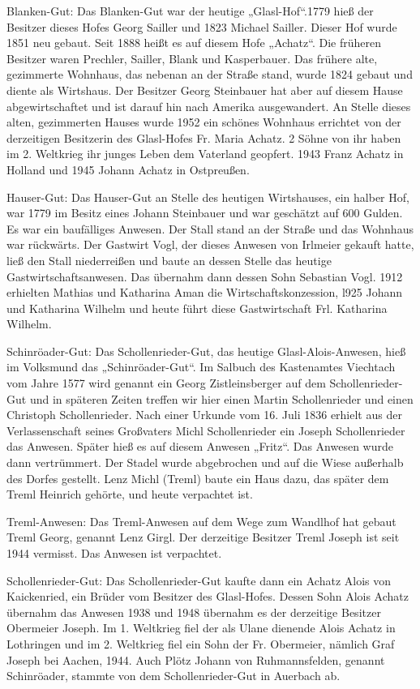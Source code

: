 \documentclass{book}
\begin{document}
Blanken-Gut: Das Blanken-Gut war der heutige „Glasl-Hof“.1779 hieß der Besitzer
dieses Hofes Georg Sailler und 1823 Michael Sailler. Dieser Hof wurde 1851 neu
gebaut. Seit 1888 heißt es auf diesem Hofe „Achatz“. Die früheren Besitzer waren
Prechler, Sailler, Blank und Kasperbauer. Das frühere alte, gezimmerte Wohnhaus,
das nebenan an der Straße stand, wurde 1824 gebaut und diente als Wirtshaus. Der
Besitzer Georg Steinbauer hat aber auf diesem Hause abgewirtschaftet und ist
darauf hin nach Amerika ausgewandert. An Stelle dieses alten, gezimmerten Hauses
wurde 1952 ein schönes Wohnhaus errichtet von der derzeitigen Besitzerin des
Glasl-Hofes Fr. Maria Achatz. 2 Söhne von ihr haben im 2. Weltkrieg ihr junges
Leben dem Vaterland geopfert. 1943 Franz Achatz in Holland und 1945 Johann
Achatz in Ostpreußen.

Hauser-Gut: Das Hauser-Gut an Stelle des heutigen Wirtshauses, ein halber Hof,
war 1779 im Besitz eines Johann Steinbauer und war geschätzt auf 600 Gulden. Es
war ein baufälliges Anwesen. Der Stall stand an der Straße und das Wohnhaus war
rückwärts. Der Gastwirt Vogl, der dieses Anwesen von Irlmeier gekauft hatte,
ließ den Stall niederreißen und baute an dessen Stelle das heutige
Gastwirtschaftsanwesen. Das übernahm dann dessen Sohn Sebastian Vogl. 1912
erhielten Mathias und Katharina Aman die Wirtschaftskonzession, l925 Johann und
Katharina Wilhelm und heute führt diese Gastwirtschaft Frl. Katharina Wilhelm.

Schinröader-Gut: Das Schollenrieder-Gut, das heutige Glasl-Alois-Anwesen, hieß
im Volksmund das „Schinröader-Gut“. Im Salbuch des Kastenamtes Viechtach vom
Jahre 1577 wird genannt ein Georg Zistleinsberger auf dem Schollenrieder-Gut und
in späteren Zeiten treffen wir hier einen Martin Schollenrieder und einen
Christoph Schollenrieder. Nach einer Urkunde vom 16. Juli 1836 erhielt aus der
Verlassenschaft seines Großvaters Michl Schollenrieder ein Joseph Schollenrieder
das Anwesen. Später hieß es auf diesem Anwesen „Fritz“. Das Anwesen wurde dann
vertrümmert. Der Stadel wurde abgebrochen und auf die Wiese außerhalb des Dorfes
gestellt. Lenz Michl (Treml) baute ein Haus dazu, das später dem Treml Heinrich
gehörte, und heute verpachtet ist.

Treml-Anwesen: Das Treml-Anwesen auf dem Wege zum Wandlhof hat gebaut Treml
Georg, genannt Lenz Girgl. Der derzeitige Besitzer Treml Joseph ist seit 1944
vermisst. Das Anwesen ist verpachtet.

Schollenrieder-Gut: Das Schollenrieder-Gut kaufte dann ein Achatz Alois von
Kaickenried, ein Brüder vom Besitzer des Glasl-Hofes. Dessen Sohn Alois Achatz
übernahm das Anwesen 1938 und 1948 übernahm es der derzeitige Besitzer Obermeier
Joseph. Im 1. Weltkrieg fiel der als Ulane dienende Alois Achatz in Lothringen
und im 2. Weltkrieg fiel ein Sohn der Fr. Obermeier, nämlich Graf Joseph bei
Aachen, 1944. Auch Plötz Johann von Ruhmannsfelden, genannt Schinröader, stammte
von dem Schollenrieder-Gut in Auerbach ab.
\end{document}
